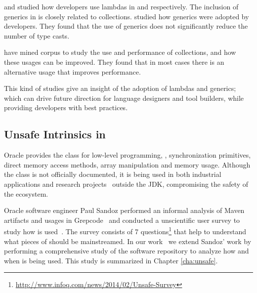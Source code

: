 \cite{mazinanianUnderstandingUseLambda2017} and \cite{uesbeckEmpiricalStudyImpact2016} studied how developers use lambdas in \java{} and \cpp{} respectively.
The inclusion of generics in \java{} is closely related to collections. 
\cite{parninJavaGenericsAdoption2011,parninAdoptionUseJava2013} studied how generics were adopted by \java{} developers.
They found that the use of generics does not significantly reduce the number of type casts.

\cite{costaEmpiricalStudyUsage2017} have mined \github{} corpus to study the use and performance of collections,
and how these usages can be improved.
They found that in most cases there is an alternative usage that
improves performance.

This kind of studies give an insight of the adoption of lambdas and generics; which can drive future direction for language designers and tool builders, while providing developers with best practices.


\subsection{Unsafe Intrinsics in \java}
\label{sec:lr:unsafe}

Oracle provides the \smu{} class for low-level programming,
\eg, synchronization primitives, direct memory access methods,
array manipulation and memory usage.
Although the \smu{} class is not officially documented,
it is being used in both industrial applications
and research projects~\citep{korlandNoninvasiveConcurrencyJava2010,pukallFlexibleDynamicSoftware,gligoricCoDeSeFastDeserialization2011}
outside the JDK, compromising the safety of the \java{} ecosystem.

Oracle software engineer Paul Sandoz performed an informal analysis of
Maven artifacts and usages in Grepcode~\citep{sandoz-personal-communication}
and conducted a unscientific user survey to study how \unsafe{} is used~\citep{psandoz14}.
The survey consists of 7 questions\footnote{\url{http://www.infoq.com/news/2014/02/Unsafe-Survey}} 
that help to understand what pieces of \smu{} should be mainstreamed.
In our work~\citep{mastrangeloUseYourOwn2015} we extend Sandoz' work
by performing a comprehensive study of the \mavencentral{}
software repository to analyze how and when \smu{} is being used.
This study is summarized in Chapter \ref{cha:unsafe}.

